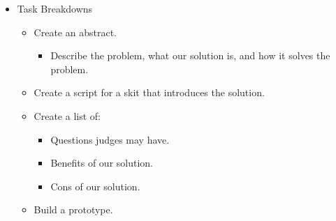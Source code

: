 
\begin{itemize}
  \item Task Breakdowns
  \begin{itemize}
    \item Create an abstract.
    \begin{itemize}
      \item Describe the problem, what our solution is, and how it solves the problem.
    \end{itemize}
    \item Create a script for a skit that introduces the solution.
    \item Create a list of:
    \begin{itemize}
      \item Questions judges may have.
      \item Benefits of our solution.
      \item Cons of our solution.
    \end{itemize}
    \item Build a prototype.
  \end{itemize}
\end{itemize}

